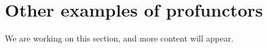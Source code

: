 

\section{Other examples of profunctors}
We are working on this section, and more content will appear.


